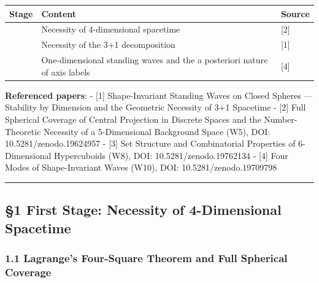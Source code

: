 \documentclass[
  a4paper,11pt]{article}
\newcounter{none} %
\begin{document}
{\def\LTcaptype{none} %
\begin{longtable}[]{@{}
  >{\centering\arraybackslash}p{}
  >{\raggedright\arraybackslash}p{}
  >{\raggedright\arraybackslash}p{}@{}}
\toprule\noalign{}
\begin{minipage}[b]{\linewidth}\centering
Stage
\end{minipage} & \begin{minipage}[b]{\linewidth}\raggedright
Content
\end{minipage} & \begin{minipage}[b]{\linewidth}\raggedright
Source
\end{minipage} \\
\midrule\noalign{}
\endhead
\bottomrule\noalign{}
\endlastfoot
1 & Necessity of 4-dimensional spacetime & {[}2{]} \\
2 & Necessity of the 3+1 decomposition & {[}1{]} \\
3 & One-dimensional standing waves and the a posteriori nature of axis
labels & {[}4{]} \\
\end{longtable}
}

\textbf{Referenced papers}: - {[}1{]} Shape-Invariant Standing Waves on
Closed Spheres --- Stability by Dimension and the Geometric Necessity of
3+1 Spacetime - {[}2{]} Full Spherical Coverage of Central Projection in
Discrete Spaces and the Number-Theoretic Necessity of a 5-Dimensional
Background Space (W5), DOI: 10.5281/zenodo.19624957 - {[}3{]} Set
Structure and Combinatorial Properties of 6-Dimensional Hypercuboids
(W8), DOI: 10.5281/zenodo.19762134 - {[}4{]} Four Modes of
Shape-Invariant Waves (W10), DOI: 10.5281/zenodo.19709798

\begin{center}\rule{0.5\linewidth}{0.5pt}\end{center}

\subsection{§1 First Stage: Necessity of 4-Dimensional
Spacetime}\label{first-stage-necessity-of-4-dimensional-spacetime}

\subsubsection{1.1 Lagrange's Four-Square Theorem and Full Spherical
Coverage}\label{lagranges-four-square-theorem-and-full-spherical-coverage}
\end{document}
